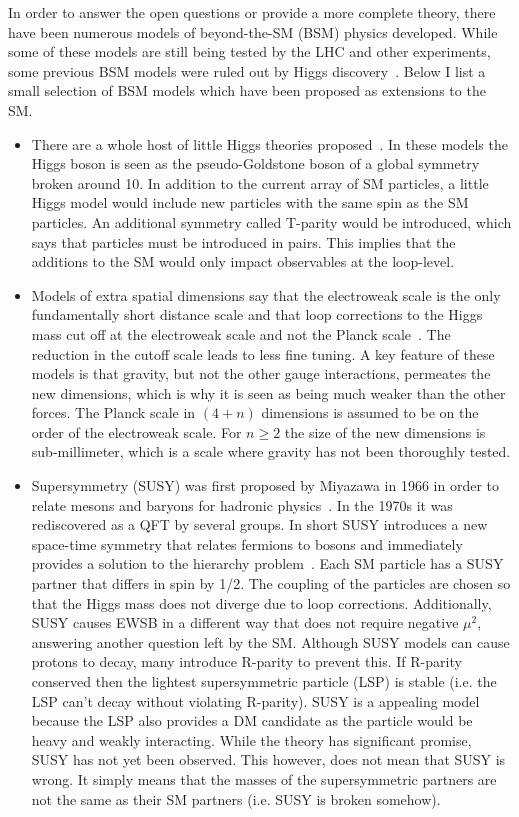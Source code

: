 In order to answer the open questions or provide a more complete theory, there have been numerous models of beyond-the-SM (BSM) physics developed. While some of these models are still being tested by the LHC and other experiments, some previous BSM models were ruled out by Higgs discovery~\cite{Cheng:2007bu}. Below I list a small selection of BSM models which have been proposed as extensions to the SM.
\begin{itemize}
	\item There are a whole host of little Higgs theories proposed~\cite{Cheng:2007bu,Reuter:2012sd,Schmaltz:2005ky}. In these models the Higgs boson is seen as the pseudo-Goldstone boson of a global symmetry broken around 10\tev. In addition to the current array of SM particles, a little Higgs model would include new particles with the same spin as the SM particles. An additional symmetry called T-parity would be introduced, which says that particles must be introduced in pairs. This implies that the additions to the SM would only impact observables at the loop-level.
	\item Models of extra spatial dimensions say that the electroweak scale is the only fundamentally short distance scale and that loop corrections to the Higgs mass cut off at the electroweak scale and not the Planck scale~\cite{ArkaniHamed:1998rs}. The reduction in the cutoff scale leads to less fine tuning. A key feature of these models is that gravity, but not the other gauge interactions, permeates the new dimensions, which is why it is seen as being much weaker than the other forces. The Planck scale in $\left(4+n\right)$ dimensions is assumed to be on the order of the electroweak scale. For $n\geq2$ the size of the new dimensions is sub-millimeter, which is a scale where gravity has not been thoroughly tested.
	\item Supersymmetry (SUSY) was first proposed by Miyazawa in 1966 in order to relate mesons and baryons for hadronic physics~\cite{doi:10.1143/PTP.36.1266,PhysRev.170.1586}. In the 1970s it was rediscovered as a QFT by several groups. In short SUSY introduces a new space-time symmetry that relates fermions to bosons and immediately provides a solution to the hierarchy problem~\cite{WESS197439,Golfand:1971iw,PhysRevLett.49.970,PhysRevD.49.6173,FAYET1975104,BARBIERI1982343,PhysRevD.27.2359,Martin:1997ns}. Each SM particle has a SUSY partner that differs in spin by 1/2. The coupling of the particles are chosen so that the Higgs mass does not diverge due to loop corrections. Additionally, SUSY causes EWSB in a different way that does not require negative $\mu^{2}$, answering another question left by the SM. Although SUSY models can cause protons to decay, many introduce R-parity to prevent this. If R-parity conserved then the lightest supersymmetric particle (LSP) is stable (i.e. the LSP can't decay without violating R-parity). SUSY is a appealing model because the LSP also provides a DM candidate as the particle would be heavy and weakly interacting. While the theory has significant promise, SUSY has not yet been observed. This however, does not mean that SUSY is wrong. It simply means that the masses of the supersymmetric partners are not the same as their SM partners (i.e. SUSY is broken somehow).
\end{itemize}

